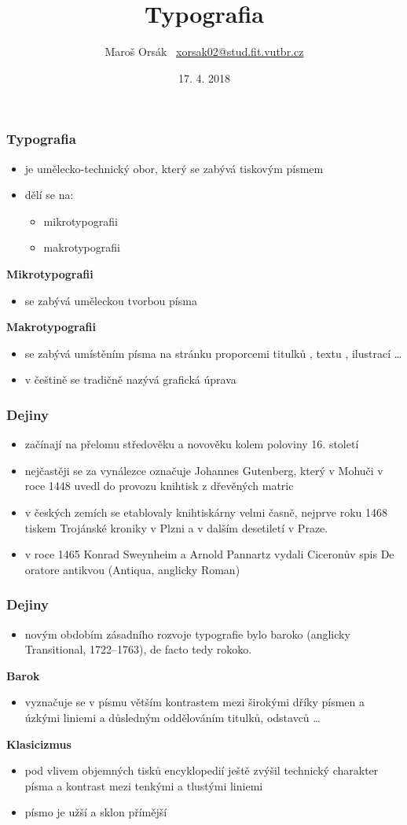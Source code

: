 \documentclass{beamer}
\title{Typografia}
\author{\texorpdfstring{Maroš Orsák \ \newline\url{xorsak02@stud.fit.vutbr.cz}}{Author}}
\institute{Vysoké učenie technické v~Brně \\Fakulta informačných technológií}
\date{17. 4. 2018}
\begin{document}
\begin{frame}
\titlepage
\end{frame}

\begin{frame}
\frametitle{Typografia}
\begin{itemize}
\item{je umělecko-technický obor, který se zabývá tiskovým písmem}
\item{dělí se na:}
\begin{itemize}
\item{mikrotypografii}
\item{makrotypografii}
\end{itemize}
\end{itemize}
\textbf{Mikrotypografii}
\begin{itemize}
\item{se zabývá uměleckou tvorbou písma}
\end{itemize}
\textbf{Makrotypografii}
\begin{itemize}
\item{se zabývá umístěním písma na stránku proporcemi titulků , textu , ilustrací \dots}
\item{v češtině se tradičně nazývá grafická úprava}
\end{itemize}
\end{frame}
\begin{frame}
\frametitle{Dejiny}
\begin{itemize}
\item{začínají na přelomu středověku a novověku kolem poloviny 16. století}
\item{nejčastěji se za vynálezce označuje Johannes Gutenberg, který v Mohuči v roce 1448 uvedl do provozu knihtisk z dřevěných matric}
\item{v českých zemích se etablovaly knihtiskárny velmi časně, nejprve roku 1468 tiskem Trojánské kroniky v Plzni a v dalším desetiletí v Praze.}
\item{v roce 1465 Konrad Sweynheim a Arnold Pannartz vydali Ciceronův spis De oratore antikvou (Antiqua, anglicky Roman)}
\end{itemize}
\end{frame}
\begin{frame}
\frametitle{Dejiny}
\begin{itemize}
\item{novým obdobím zásadního rozvoje typografie bylo baroko (anglicky Transitional, 1722–1763), de facto tedy rokoko.}
\end{itemize}
\textbf{Barok}
\begin{itemize}
\item{vyznačuje se v písmu větším kontrastem mezi širokými dříky písmen a úzkými liniemi a důsledným oddělováním titulků, odstavců \dots}
\end{itemize}
\textbf{Klasicizmus}
\begin{itemize}
\item{pod vlivem objemných tisků encyklopedií ještě zvýšil technický charakter písma a kontrast mezi tenkými a tlustými liniemi}
\item{písmo je užší a sklon přímější}
\end{itemize}
\end{frame}
\end{document}
